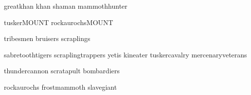 

{greatkhan}
{khan}
{shaman}
{mammothhunter}

\clearpage
{}

{tuskerMOUNT}
{rockaurochsMOUNT}

\clearpage
{}

{tribesmen}
{bruisers}
\newpage
{scraplings}

\clearpage
{}

{sabretoothtigers}
{scraplingtrappers}
{yetis}
{kineater}
{tuskercavalry}
{mercenaryveterans}

\clearpage
{}

{thundercannon}
{scratapult}
{bombardiers}

\clearpage
{}

{rockaurochs}
{frostmammoth}
{slavegiant}
